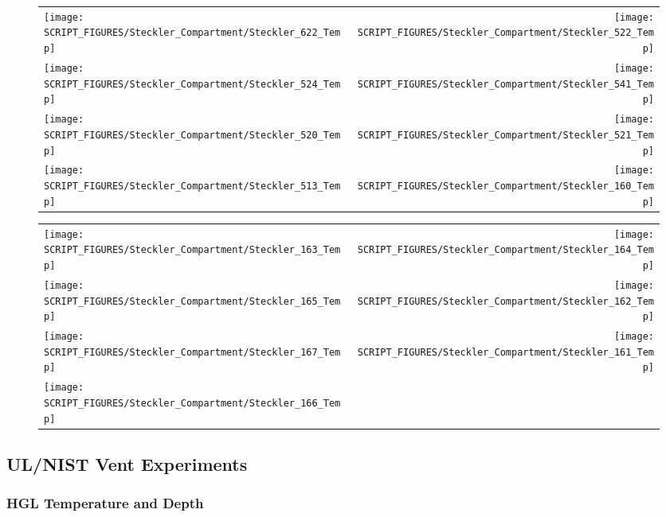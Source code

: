 \begin{figure}[!ht]
\begin{tabular*}{\textwidth}{l@{\extracolsep{\fill}}r}
\texttt{[image: SCRIPT\_FIGURES/Steckler\_Compartment/Steckler\_622\_Temp]} &
\texttt{[image: SCRIPT\_FIGURES/Steckler\_Compartment/Steckler\_522\_Temp]} \\
\texttt{[image: SCRIPT\_FIGURES/Steckler\_Compartment/Steckler\_524\_Temp]} &
\texttt{[image: SCRIPT\_FIGURES/Steckler\_Compartment/Steckler\_541\_Temp]} \\
\texttt{[image: SCRIPT\_FIGURES/Steckler\_Compartment/Steckler\_520\_Temp]} &
\texttt{[image: SCRIPT\_FIGURES/Steckler\_Compartment/Steckler\_521\_Temp]} \\
\texttt{[image: SCRIPT\_FIGURES/Steckler\_Compartment/Steckler\_513\_Temp]} &
\texttt{[image: SCRIPT\_FIGURES/Steckler\_Compartment/Steckler\_160\_Temp]}
\end{tabular*}
\label{Steckler_Temp_6}
\end{figure}

\begin{figure}[!ht]
\begin{tabular*}{\textwidth}{l@{\extracolsep{\fill}}r}
\texttt{[image: SCRIPT\_FIGURES/Steckler\_Compartment/Steckler\_163\_Temp]} &
\texttt{[image: SCRIPT\_FIGURES/Steckler\_Compartment/Steckler\_164\_Temp]} \\
\texttt{[image: SCRIPT\_FIGURES/Steckler\_Compartment/Steckler\_165\_Temp]} &
\texttt{[image: SCRIPT\_FIGURES/Steckler\_Compartment/Steckler\_162\_Temp]} \\
\texttt{[image: SCRIPT\_FIGURES/Steckler\_Compartment/Steckler\_167\_Temp]} &
\texttt{[image: SCRIPT\_FIGURES/Steckler\_Compartment/Steckler\_161\_Temp]} \\
\texttt{[image: SCRIPT\_FIGURES/Steckler\_Compartment/Steckler\_166\_Temp]} &
\end{tabular*}
\label{Steckler_Temp_7}
\end{figure}

\clearpage

\subsection{UL/NIST Vent Experiments}

\subsubsection{HGL Temperature and Depth}

